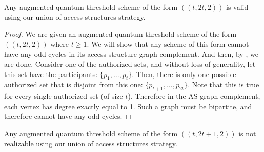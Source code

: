 \begin{theorem}
    \label{thm:t-2t-2}
    Any augmented quantum threshold scheme of the form $((t,2t,2))$ is valid using our union of access structures strategy.
\end{theorem}

\begin{proof}
    We are given an augmented quantum threshold scheme of the form $((t,2t,2))$ where $t \geq 1$. We will show that any scheme of this form cannot have any odd cycles in its access structure graph complement. And then, by , we are done. Consider one of the authorized sets, and without loss of generality, let this set have the participants: $\{p_1,\dots,p_t\}$. Then, there is only one possible authorized set that is disjoint from this one: $\{p_{t+1},\dots,p_{2t}\}$. Note that this is true for every single authorized set (of size $t$). Therefore in the AS graph complement, each vertex has degree exactly equal to 1. Such a graph must be bipartite, and therefore cannot have any odd cycles.
\end{proof}

\begin{theorem}
    \label{thm:t-2t+1-2}
    Any augmented quantum threshold scheme of the form $((t,2t+1,2))$ is not realizable using our union of  access structures strategy.
\end{theorem}
 

